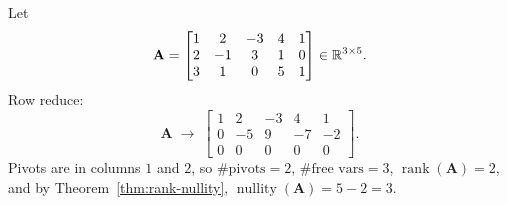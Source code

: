 \begin{example}
  Let
  \[
    \mathbf{A} =
    \begin{bmatrix}
      1 & 2 & -3 & 4 & 1 \\ 2 & -1 & 3 & 1 & 0 \\ 3 & 1 & 0 & 5 & 1
    \end{bmatrix}
    \in \mathbb{R}^{3 \times 5}.
  \]
  Row reduce:
  \[
    \mathbf{A}
    \;\rightarrow\;
    \begin{bmatrix}
      1 & 2 & -3 & 4 & 1 \\ 0 & -5 & 9 & -7 & -2 \\ 0 & 0 & 0 & 0 & 0
    \end{bmatrix}
    .
  \]
  Pivots are in columns $1$ and $2$, so $\#\text{pivots} = 2$, $\#\text{free vars} = 3$, $\operatorname{rank}(\mathbf{A}) = 2$, and by Theorem~\ref{thm:rank-nullity}, $\operatorname{nullity}(\mathbf{A}) = 5 - 2 = 3$.


\end{example}
